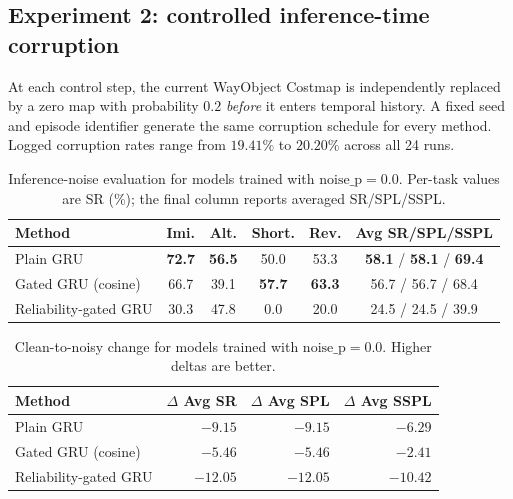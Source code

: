 \documentclass[conference]{IEEEtran}
\begin{document}
\subsection{Experiment 2: controlled inference-time corruption}
\label{sec:noise}

At each control step, the current WayObject Costmap is independently replaced by a zero map with probability $0.2$ \emph{before} it enters temporal history. A fixed seed and episode identifier generate the same corruption schedule for every method. Logged corruption rates range from $19.41\%$ to $20.20\%$ across all 24 runs.

\begin{table}[htbp]
\centering
\caption{Inference-noise evaluation for models trained with
$\mathrm{noise\_p}{=}0.0$. Per-task values are SR (\%); the final column
reports averaged SR/SPL/SSPL.}
\label{tab:noise_train00}
\small
\setlength{\tabcolsep}{3.5pt}
\begin{tabular}{lcccc c}
\toprule
Method & Imi. & Alt. & Short. & Rev. & Avg SR/SPL/SSPL \\
\midrule
Plain GRU             & \textbf{72.7} & \textbf{56.5} & 50.0 & 53.3 & \textbf{58.1} / \textbf{58.1} / \textbf{69.4} \\
Gated GRU (cosine)    & 66.7 & 39.1 & \textbf{57.7} & \textbf{63.3} & 56.7 / 56.7 / 68.4 \\
Reliability-gated GRU & 30.3 & 47.8 & 0.0 & 20.0 & 24.5 / 24.5 / 39.9 \\
\bottomrule
\end{tabular}
\end{table}

\begin{table}[htbp]
\centering
\caption{Clean-to-noisy change for models trained with
$\mathrm{noise\_p}{=}0.0$. Higher deltas are better.}
\label{tab:noise_delta_train00}
\small
\setlength{\tabcolsep}{5pt}
\begin{tabular}{lrrr}
\toprule
Method & $\Delta$ Avg SR & $\Delta$ Avg SPL & $\Delta$ Avg SSPL \\
\midrule
Plain GRU             & $-9.15$ & $-9.15$ & $-6.29$ \\
Gated GRU (cosine)    & $\mathbf{-5.46}$ & $\mathbf{-5.46}$ & $\mathbf{-2.41}$ \\
Reliability-gated GRU & $-12.05$ & $-12.05$ & $-10.42$ \\
\bottomrule
\end{tabular}
\end{table}
\end{document}
